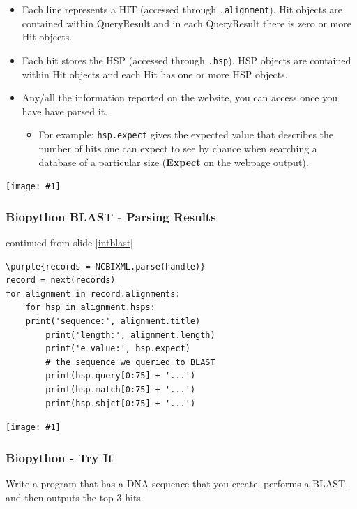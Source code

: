 \documentclass[xcolor=svgnames]{beamer}
\newcommand{\purple}[1]{{\textcolor{purple}{#1}}}
\newcommand{\nl}{\\[1em]}
\newcommand{\ipic}[2]{\texttt{[image: \#1]}}
\newcommand{\ft}[1]{\frametitle{#1}}
\begin{document}
\begin{frame}
\begin{itemize}
\item Each line represents a HIT (accessed through {\tt .alignment}). Hit objects are contained within QueryResult and in each QueryResult there is zero or more Hit objects.\nl
\item Each hit stores the HSP (accessed through {\tt .hsp}).  HSP objects are contained within Hit objects and each Hit has one or more HSP objects.  \nl
\item Any/all the information reported on the website, you can access once you have have parsed it. 
\begin{itemize}
\item For example: {\tt hsp.expect} gives the  expected value that describes the number of hits one can expect to see by chance when searching a database of a particular size ({\bf Expect} on the webpage output).
\end{itemize}

\end{itemize}
\end{frame}


\begin{frame}
\ipic{img/hsp2}{1.0}
\end{frame}



\begin{frame}[fragile]\ft{Biopython BLAST - Parsing Results}
continued from slide \ref{intblast}
\begin{Verbatim}[xleftmargin=.1in, commandchars=\\\{\}] 
\purple{records = NCBIXML.parse(handle)}
record = next(records)
for alignment in record.alignments:
    for hsp in alignment.hsps:
	print('sequence:', alignment.title)
        print('length:', alignment.length)
        print('e value:', hsp.expect)
        # the sequence we queried to BLAST
        print(hsp.query[0:75] + '...')
        print(hsp.match[0:75] + '...')
        print(hsp.sbjct[0:75] + '...')

\end{Verbatim}
\end{frame}


\begin{frame}
\ipic{img/yes2}{1.0}
\end{frame}


\begin{frame}[fragile]\ft{Biopython - Try It}
\begin{example}
Write a program that has a DNA sequence that you create, performs a BLAST, and then outputs the top 3 hits.\end{example}
\end{frame}
\end{document}
